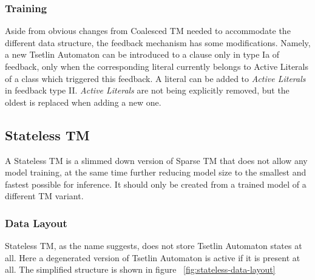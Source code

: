 \subsubsection{Training}
Aside from obvious changes from Coalesced TM needed to accommodate the different data structure, the feedback mechanism has some modifications. Namely, a new Tsetlin Automaton can be introduced to a clause only in type Ia of feedback, only when the corresponding literal currently belongs to Active Literals of a class which triggered this feedback. A literal can be added to \textit{Active Literals} in feedback type II. \textit{Active Literals} are not being explicitly removed, but the oldest is replaced when adding a new one.

\subsection{Stateless TM}
A Stateless TM is a slimmed down version of Sparse TM that does not allow any model training, at the same time further reducing model size to the smallest and fastest possible for inference. It should only be created from a trained model of a different TM variant.

\subsubsection{Data Layout}
Stateless TM, as the name suggests, does not store Tsetlin Automaton states at all. Here a degenerated version of Tsetlin Automaton is active if it is present at all. The simplified structure is shown in figure ~\ref{fig:stateless-data-layout}

